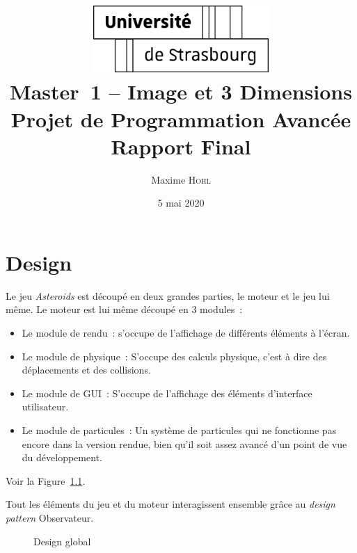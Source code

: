 \documentclass[10pt, french, a4paper]{report}
\title{
	\includegraphics[width=0.5\textwidth]{logo-uds.pdf}\\
	\vspace{2em}
	Master~1 -- Image et 3 Dimensions\\
	Projet de Programmation Avancée\\
	Rapport Final
}
\author{Maxime \textsc{Hohl}}
\date{5 mai 2020}
\begin{document}
\maketitle

\tableofcontents

\chapter{Design}

Le jeu \textit{Asteroids} est découpé en deux grandes parties, le moteur et le jeu lui 
même. Le moteur est lui même découpé en 3 modules~:
\begin{itemize}
	\item Le module de rendu~: s'occupe de l'affichage de différents éléments à l'écran.
	\item Le module de physique~: S'occupe des calculs physique, c'est à dire des
	      déplacements et des collisions.
	\item Le module de GUI~: S'occupe de l'affichage des éléments d'interface utilisateur.
	\item Le module de particules~: Un système de particules qui ne fonctionne pas encore 
	      dans la version rendue, bien qu'il soit assez avancé d'un point de vue du 
	      développement.
\end{itemize}
Voir la Figure~\ref{fig:design-global}.

Tout les éléments du jeu et du moteur interagissent ensemble grâce au \textit{design pattern} Observateur.

\begin{figure}[h]
	\center
	\caption{Design global}
	\label{fig:design-global}
\end{figure}
\end{document}
